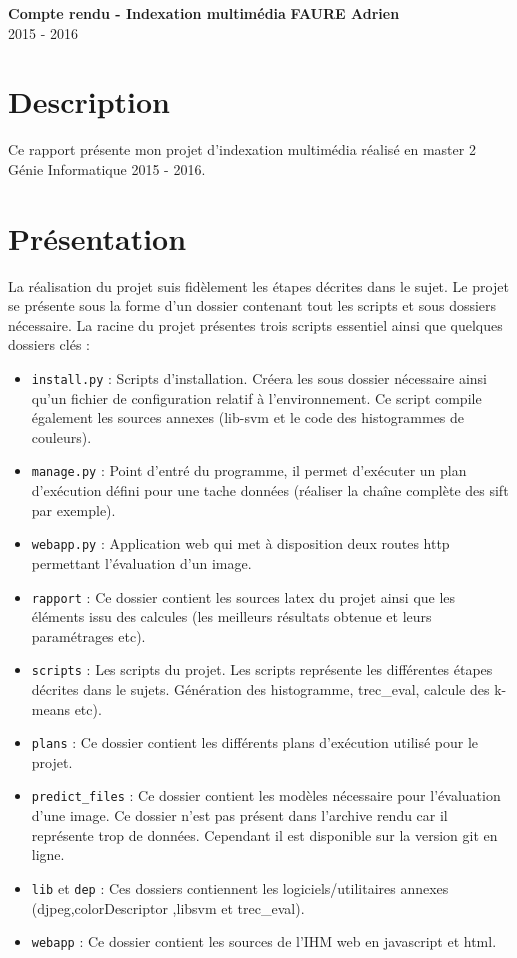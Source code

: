 \documentclass[a4paper, 11pt]{article}
\begin{document}
\noindent
\large\textbf{Compte rendu - Indexation multimédia} \hfill \textbf{FAURE Adrien} \\
2015 - 2016

\tableofcontents

\section{Description}
Ce rapport présente mon projet d'indexation multimédia réalisé en master 2 Génie Informatique 2015 - 2016.

\section{Présentation}
La réalisation du projet suis fidèlement les étapes décrites dans le sujet.
Le projet se présente sous la forme d'un dossier contenant tout les scripts et sous dossiers nécessaire. La racine du projet présentes trois scripts essentiel ainsi que quelques dossiers clés :
\begin{itemize}
	\item \texttt{install.py} : Scripts d'installation. Créera les sous dossier nécessaire ainsi qu'un fichier de configuration relatif à l'environnement. Ce script compile également les sources annexes (lib-svm et le code des histogrammes de couleurs).
    \item \texttt{manage.py} : Point d'entré du programme, il permet d'exécuter un plan d'exécution défini pour une tache données (réaliser la chaîne complète des sift par exemple).
    \item \texttt{webapp.py} : Application web qui met à disposition deux routes http permettant l'évaluation d'un image.
    \item \texttt{rapport} : Ce dossier contient les sources latex du projet ainsi que les éléments issu des calcules (les meilleurs résultats obtenue et leurs paramétrages etc).
    \item \texttt{scripts} : Les scripts du projet. Les scripts représente les différentes étapes décrites dans le sujets. Génération des histogramme, trec\_eval, calcule des k-means etc).
    \item \texttt{plans} : Ce dossier contient les différents plans d'exécution utilisé pour le projet.
    \item \texttt{predict\_files} : Ce dossier contient les modèles nécessaire pour l'évaluation d'une image. Ce dossier n'est pas présent dans l'archive rendu car il représente trop de données. Cependant il est disponible sur la version git en ligne.
    \item \texttt{lib} et \texttt{dep} : Ces dossiers contiennent les logiciels/utilitaires annexes (djpeg,colorDescriptor ,lib\-svm et trec\_eval).
	\item \texttt{webapp} : Ce dossier contient les sources de l'IHM web en javascript et html.
\end{itemize}
\end{document}
